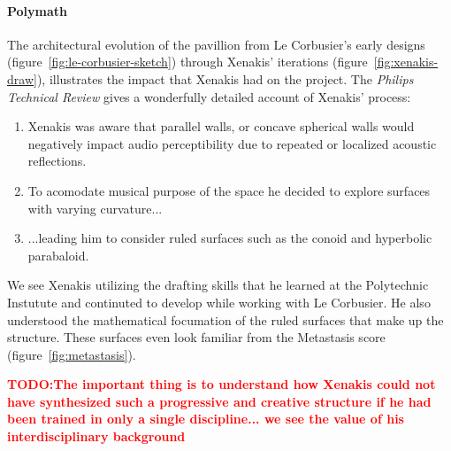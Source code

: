 \documentclass{tufte-book}
\newcommand{\TODO}[1]{\textcolor{red}{\bf TODO:#1}\xspace}
\begin{document}
\paragraph{Polymath} The architectural evolution of the pavillion from
Le Corbusier's early designs (figure~\ref{fig:le-corbusier-sketch})
through Xenakis' iterations (figure~\ref{fig:xenakis-draw}),
illustrates the impact that Xenakis had on the project. The
\textit{Philips Technical Review}\cite{philips1958} gives a
wonderfully detailed account of Xenakis' process:
\begin{enumerate}
\item Xenakis was aware that parallel walls, or concave spherical
  walls would negatively impact audio perceptibility due to repeated
  or localized acoustic reflections.
\item To acomodate musical purpose of the space he decided to explore
  surfaces with varying curvature...
\item ...leading him to consider ruled
  surfaces\sidenote{\TODO{Explain}} such as the conoid and hyperbolic
  parabaloid.
\end{enumerate}
We see Xenakis utilizing the drafting skills that he learned at the
Polytechnic Instutute and continuted to develop while working with Le
Corbusier. He also understood the mathematical focumation of the ruled
surfaces that make up the structure. These surfaces even look familiar
from the Metastasis score (figure~\ref{fig:metastasis}).

\TODO{The important thing is to understand how Xenakis could not have
synthesized such a progressive and creative structure if he had been
trained in only a single discipline... we see the value of his
interdisciplinary background}
\end{document}
